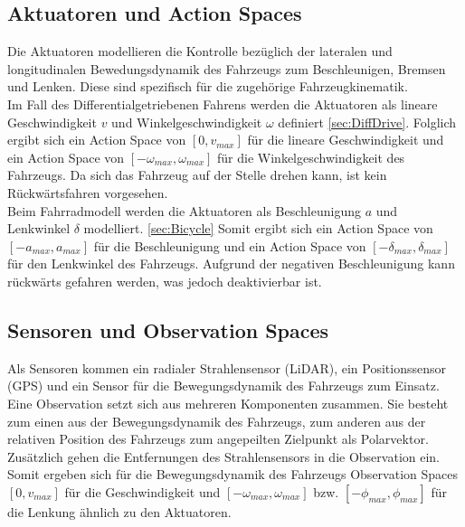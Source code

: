 \subsection{Aktuatoren und Action Spaces}
Die Aktuatoren modellieren die Kontrolle bezüglich der lateralen und longitudinalen
Bewedungsdynamik des Fahrzeugs zum Beschleunigen, Bremsen und Lenken. Diese sind
spezifisch für die zugehörige Fahrzeugkinematik.\\

Im Fall des Differentialgetriebenen Fahrens werden die Aktuatoren als lineare
Geschwindigkeit $v$ und Winkelgeschwindigkeit $\omega$ definiert \ref{sec:DiffDrive}.
Folglich ergibt sich ein Action Space von $[0, v_{max}]$ für die lineare
Geschwindigkeit und ein Action Space von $[-\omega_{max}, \omega_{max}]$
für die Winkelgeschwindigkeit des Fahrzeugs. Da sich das Fahrzeug auf der
Stelle drehen kann, ist kein Rückwärtsfahren vorgesehen.\\

Beim Fahrradmodell werden die Aktuatoren als Beschleunigung $a$ und Lenkwinkel
$\delta$ modelliert. \ref{sec:Bicycle} Somit ergibt sich ein Action Space von
$[-a_{max}, a_{max}]$ für die Beschleunigung und ein Action Space von
$[-\delta_{max}, \delta_{max}]$ für den Lenkwinkel des Fahrzeugs. Aufgrund der
negativen Beschleunigung kann rückwärts gefahren werden, was jedoch deaktivierbar ist.

\subsection{Sensoren und Observation Spaces}
Als Sensoren kommen ein radialer Strahlensensor (LiDAR), ein Positionssensor (GPS)
und ein Sensor für die Bewegungsdynamik des Fahrzeugs zum Einsatz.\\

Eine Observation setzt sich aus mehreren Komponenten zusammen. Sie besteht
zum einen aus der Bewegungsdynamik des Fahrzeugs, zum anderen aus
der relativen Position des Fahrzeugs zum angepeilten Zielpunkt als Polarvektor.
Zusätzlich gehen die Entfernungen des Strahlensensors in die Observation ein.
Somit ergeben sich für die Bewegungsdynamik des Fahrzeugs Observation Spaces
$[0, v_{max}]$ für die Geschwindigkeit und $[-\omega_{max}, \omega_{max}]$
bzw. $[-\phi_{max}, \phi_{max}]$ für die Lenkung ähnlich zu den Aktuatoren.

